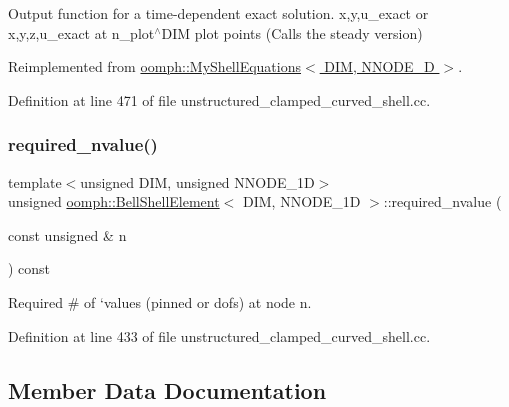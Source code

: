 Output function for a time-\/dependent exact solution. x,y,u\+\_\+exact or x,y,z,u\+\_\+exact at n\+\_\+plot$^\wedge$\+D\+IM plot points (Calls the steady version) 



Reimplemented from \hyperlink{classoomph_1_1MyShellEquations_a7022e91eaf4bff9044e46549bbe0c3f5}{oomph\+::\+My\+Shell\+Equations$<$ D\+I\+M, N\+N\+O\+D\+E\+\_\+D $>$}.



Definition at line 471 of file unstructured\+\_\+clamped\+\_\+curved\+\_\+shell.\+cc.

\mbox{\label{classoomph_1_1BellShellElement_aea6c22273ebe4a34111846313716fb0f}} 
\subsubsection{\texorpdfstring{required\+\_\+nvalue()}{required\_nvalue()}}
{\footnotesize\ttfamily template$<$unsigned D\+IM, unsigned N\+N\+O\+D\+E\+\_\+1D$>$ \\
unsigned \hyperlink{classoomph_1_1BellShellElement}{oomph\+::\+Bell\+Shell\+Element}$<$ D\+IM, N\+N\+O\+D\+E\+\_\+1D $>$\+::required\+\_\+nvalue (\begin{DoxyParamCaption}\item[{const unsigned \&}]{n }\end{DoxyParamCaption}) const\hspace{0.3cm}{\ttfamily [inline]}}



Required \# of `values\textquotesingle{} (pinned or dofs) at node n. 



Definition at line 433 of file unstructured\+\_\+clamped\+\_\+curved\+\_\+shell.\+cc.



\subsection{Member Data Documentation}
\mbox{\label{classoomph_1_1BellShellElement_a85143ad34e170cb267211069ee7e334f}} 
